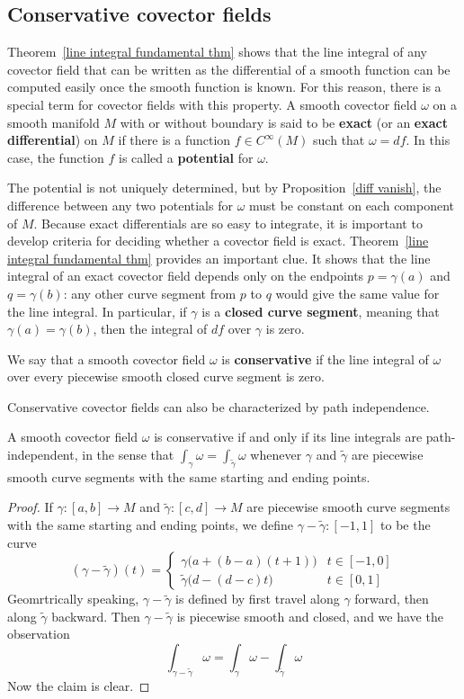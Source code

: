 \subsection{Conservative covector fields}
Theorem~\ref{line integral fundamental thm} shows that the line integral of any covector field that can be written as the differential of a smooth function can be computed easily once the smooth function is known. For this reason, there is a special term for covector fields with this property. A smooth covector field $\omega$ on a smooth manifold $M$ with or without boundary is said to be \textbf{exact} (or an \textbf{exact differential}) on $M$ if there is a function $f\in C^\infty(M)$ such that $\omega=df$. In this case, the function $f$ is called a \textbf{potential} for $\omega$.\par
The potential is not uniquely determined, but by Proposition~\ref{diff vanish}, the difference between any two potentials for $\omega$ must be constant on each component of $M$. Because exact differentials are so easy to integrate, it is important to develop criteria for deciding whether a covector field is exact. Theorem~\ref{line integral fundamental thm} provides an important clue. It shows that the line integral of an exact covector field depends only on the endpoints $p=\gamma(a)$ and $q=\gamma(b)$: any other curve segment from $p$ to $q$ would give the same value for the line integral. In particular, if $\gamma$ is a \textbf{closed curve segment}, meaning that $\gamma(a)=\gamma(b)$, then the integral of $df$ over $\gamma$ is zero.\par
We say that a smooth covector field $\omega$ is \textbf{conservative} if the line integral of $\omega$ over every piecewise smooth closed curve segment is zero.\par
Conservative covector fields can also be characterized by path independence.
\begin{proposition}
A smooth covector field $\omega$ is conservative if and only if its line integrals are path-independent, in the sense that $\int_\gamma\omega=\int_{\widetilde{\gamma}}\omega$ whenever $\gamma$ and $\widetilde{\gamma}$ are piecewise smooth curve segments with the same starting and ending points.
\end{proposition}
\begin{proof}
If $\gamma:[a,b]\to M$ and $\widetilde{\gamma}:[c,d]\to M$ are piecewise smooth curve segments with the same starting and ending points, we define $\gamma-\widetilde{\gamma}:[-1,1]$ to be the curve
\[(\gamma-\widetilde{\gamma})(t)=\begin{cases}
\gamma\big(a+(b-a)(t+1)\big)&t\in[-1,0]\\
\widetilde{\gamma}\big(d-(d-c)t\big)&t\in[0,1]
\end{cases}\]
Geomrtrically speaking, $\gamma-\widetilde{\gamma}$ is defined by first travel along $\gamma$ forward, then along $\widetilde{\gamma}$ backward. Then $\gamma-\widetilde{\gamma}$ is piecewise smooth and closed, and we have the observation
\[\int_{\gamma-\widetilde{\gamma}}\omega=\int_{\gamma}\omega-\int_{\widetilde{\gamma}}\omega\]
Now the claim is clear.
\end{proof}
